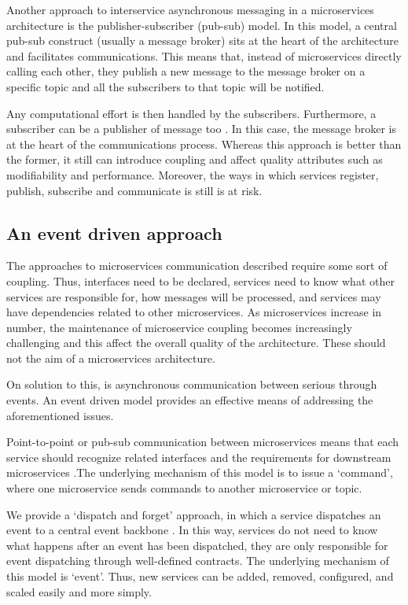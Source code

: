 \documentclass[10pt, conference]{IEEEtran}
\begin{document}
Another approach to interservice asynchronous messaging in a microservices architecture is the publisher-subscriber (pub-sub) model. In this model, a central pub-sub construct (usually a message broker) sits at the heart of the architecture and facilitates communications. This means that, instead of microservices directly calling each other, they publish a new message to the message broker on a specific topic and all the subscribers to that topic will be notified.

Any computational effort is then handled by the subscribers. Furthermore, a subscriber can be a publisher of message too \cite{Indrasiri}. In this case, the message broker is at the heart of the communications process. Whereas this approach is better than the former, it still can introduce coupling and affect quality attributes such as modifiability and performance. Moreover, the ways in which services register, publish, subscribe and communicate is still is at risk.

\subsection{An event driven approach}

The approaches to microservices communication described require some sort of coupling. Thus, interfaces need to be declared, services need to know what other services are responsible for, how messages will be processed, and services may have dependencies related to other microservices. As microservices increase in number, the maintenance of microservice coupling becomes increasingly challenging and this affect the overall quality of the architecture. These should not the aim of a microservices architecture.

On solution to this, is asynchronous communication between serious through events. An event driven model provides an effective means of addressing the aforementioned issues.

Point-to-point or pub-sub communication between microservices means that each service should recognize related interfaces and the requirements for downstream microservices \cite{Gupta,Molina}.The underlying mechanism of this model is to issue a ‘command’, where one microservice sends commands to another microservice or topic.

We provide a ‘dispatch and forget’ approach, in which a service dispatches an event to a central event backbone \cite{Michelson}. In this way, services do not need to know what happens after an event has been dispatched, they are only responsible for event dispatching through well-defined contracts. The underlying mechanism of this model is ‘event’. Thus, new services can be added, removed, configured, and scaled easily and more simply.
\end{document}
